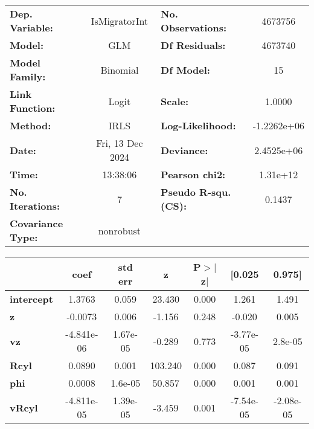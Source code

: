 \begin{center}
\begin{tabular}{lclc}
\toprule
\textbf{Dep. Variable:}   &  IsMigratorInt   & \textbf{  No. Observations:  } &   4673756    \\
\textbf{Model:}           &       GLM        & \textbf{  Df Residuals:      } &   4673740    \\
\textbf{Model Family:}    &     Binomial     & \textbf{  Df Model:          } &        15    \\
\textbf{Link Function:}   &      Logit       & \textbf{  Scale:             } &     1.0000   \\
\textbf{Method:}          &       IRLS       & \textbf{  Log-Likelihood:    } & -1.2262e+06  \\
\textbf{Date:}            & Fri, 13 Dec 2024 & \textbf{  Deviance:          } &  2.4525e+06  \\
\textbf{Time:}            &     13:38:06     & \textbf{  Pearson chi2:      } &   1.31e+12   \\
\textbf{No. Iterations:}  &        7         & \textbf{  Pseudo R-squ. (CS):} &    0.1437    \\
\textbf{Covariance Type:} &    nonrobust     & \textbf{                     } &              \\
\bottomrule
\end{tabular}
\begin{tabular}{lcccccc}
                   & \textbf{coef} & \textbf{std err} & \textbf{z} & \textbf{P$> |$z$|$} & \textbf{[0.025} & \textbf{0.975]}  \\
\midrule
\textbf{intercept} &       1.3763  &        0.059     &    23.430  &         0.000        &        1.261    &        1.491     \\
\textbf{z}         &      -0.0073  &        0.006     &    -1.156  &         0.248        &       -0.020    &        0.005     \\
\textbf{vz}        &   -4.841e-06  &     1.67e-05     &    -0.289  &         0.773        &    -3.77e-05    &      2.8e-05     \\
\textbf{Rcyl}      &       0.0890  &        0.001     &   103.240  &         0.000        &        0.087    &        0.091     \\
\textbf{phi}       &       0.0008  &      1.6e-05     &    50.857  &         0.000        &        0.001    &        0.001     \\
\textbf{vRcyl}     &   -4.811e-05  &     1.39e-05     &    -3.459  &         0.001        &    -7.54e-05    &    -2.08e-05     \\

\end{tabular}
\end{center}
